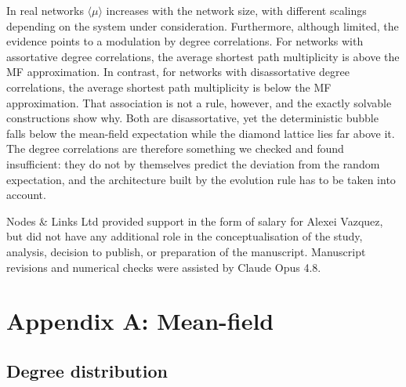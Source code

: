 \documentclass[reprint,aps,pre,amsmath,amssymb,superscriptaddress,showpacs]{revtex4-1}
\begin{document}
In real networks $\langle\mu\rangle$  increases with the network size, with different scalings depending on the system under consideration. Furthermore, although limited, the evidence points to a modulation by degree correlations. For networks with assortative degree correlations, the average shortest path multiplicity is above the MF approximation. In contrast, for networks with disassortative degree correlations, the average shortest path multiplicity is below the MF approximation. That association is not a rule, however, and the exactly solvable constructions show why. Both are disassortative, yet the deterministic bubble falls below the mean-field expectation while the diamond lattice lies far above it. The degree correlations are therefore something we checked and found insufficient: they do not by themselves predict the deviation from the random expectation, and the architecture built by the evolution rule has to be taken into account.

\begin{acknowledgments}
Nodes \& Links Ltd provided support in the form of salary for Alexei Vazquez, but did not have any additional role in the conceptualisation of the study, analysis, decision to publish, or preparation of the manuscript. Manuscript revisions and numerical checks were assisted by Claude Opus 4.8.
\end{acknowledgments}

\section*{Appendix A: Mean-field}
\label{MF}

\subsection*{Degree distribution}
\label{degree_dis}
\end{document}
